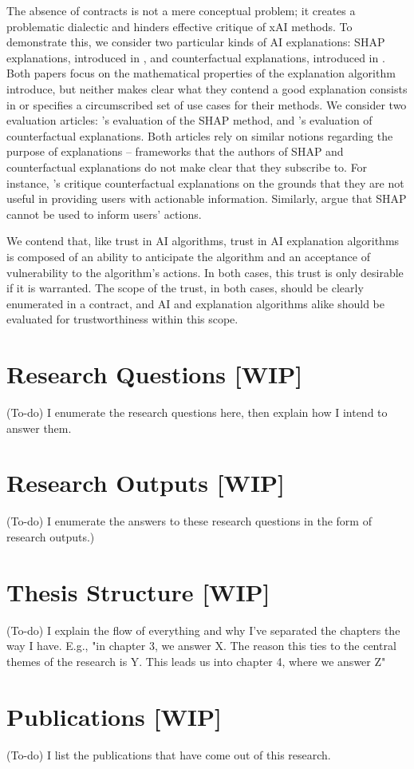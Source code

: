 The absence of contracts is not a mere conceptual problem; it creates a problematic dialectic and hinders effective critique of xAI methods. To demonstrate this, we consider two particular kinds of AI explanations: SHAP explanations, introduced in \textcite{lundberg_unified_2017}, and counterfactual explanations, introduced in \textcite{wachter_counterfactual_2017}. Both papers focus on the mathematical properties of the explanation algorithm introduce, but neither makes clear what they contend a good explanation consists in or specifies a circumscribed set of use cases for their methods. We consider two evaluation articles: \textcite{kumar_problems_2020}'s evaluation of the SHAP method, and \textcite{barocas_hidden_2020}'s evaluation of counterfactual explanations. Both articles rely on similar notions regarding the purpose of explanations – frameworks that the authors of SHAP and counterfactual explanations do not make clear that they subscribe to. For instance, \textcite{barocas_hidden_2020}'s critique counterfactual explanations on the grounds that they are not useful in providing users with actionable information. Similarly, \textcite{kumar_problems_2020} argue that SHAP cannot be used to inform users' actions.

We contend that, like trust in AI algorithms, trust in AI explanation algorithms is composed of an ability to anticipate the algorithm and an acceptance of vulnerability to the algorithm's actions. In both cases, this trust is only desirable if it is warranted. The scope of the trust, in both cases, should be clearly enumerated in a contract, and AI and explanation algorithms alike should be evaluated for trustworthiness within this scope.

\section{Research Questions [WIP]}
(To-do) I enumerate the research questions here, then explain how I intend to answer them.

\section{Research Outputs [WIP]}
(To-do) I enumerate the answers to these research questions in the form of research outputs.)

\section{Thesis Structure [WIP]}
(To-do) I explain the flow of everything and why I've separated the chapters the way I have. E.g., "in chapter 3, we answer X. The reason this ties to the central themes of the research is Y. This leads us into chapter 4, where we answer Z"

\section{Publications [WIP]}
(To-do) I list the publications that have come out of this research.